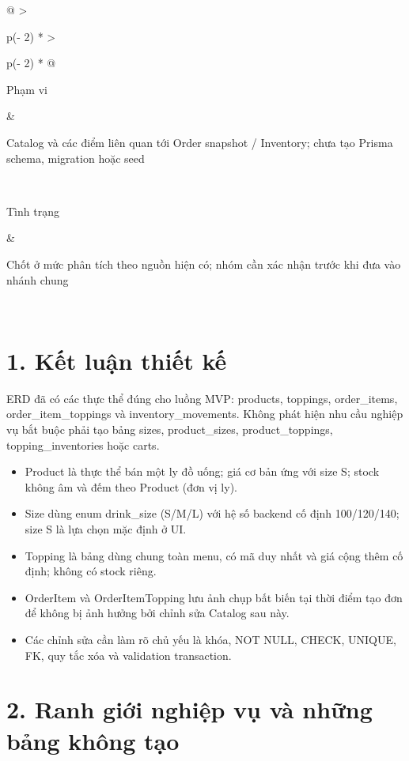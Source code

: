 \documentclass[11pt,a4paper,oneside]{report}
\begin{document}
\begin{longtable}[]{@{}
  >{\raggedright\arraybackslash}p{(\columnwidth - 2\tabcolsep) * }
  >{\raggedright\arraybackslash}p{(\columnwidth - 2\tabcolsep) * }@{}}
\begin{minipage}[b]{\linewidth}
Phạm vi
\end{minipage} & \begin{minipage}[b]{\linewidth}\raggedright
Catalog và các điểm liên quan tới Order snapshot / Inventory; chưa tạo Prisma schema, migration hoặc seed
\end{minipage} \\
\begin{minipage}[b]{\linewidth}\raggedright
Tình trạng
\end{minipage} & \begin{minipage}[b]{\linewidth}\raggedright
Chốt ở mức phân tích theo nguồn hiện có; nhóm cần xác nhận trước khi đưa vào nhánh chung
\end{minipage} \\
\midrule\noalign{}
\endhead
\bottomrule\noalign{}
\endlastfoot
\end{longtable}

\section{1. Kết luận thiết kế}\label{06-product-data-model:kux1ebft-luux1eadn-thiux1ebft-kux1ebf}

ERD đã có các thực thể đúng cho luồng MVP: products, toppings, order\_items, order\_item\_toppings và inventory\_movements. Không phát hiện nhu cầu nghiệp vụ bắt buộc phải tạo bảng sizes, product\_sizes, product\_toppings, topping\_inventories hoặc carts.

\begin{itemize}
\item
  Product là thực thể bán một ly đồ uống; giá cơ bản ứng với size S; stock không âm và đếm theo Product (đơn vị ly).
\item
  Size dùng enum drink\_size (S/M/L) với hệ số backend cố định 100/120/140; size S là lựa chọn mặc định ở UI.
\item
  Topping là bảng dùng chung toàn menu, có mã duy nhất và giá cộng thêm cố định; không có stock riêng.
\item
  OrderItem và OrderItemTopping lưu ảnh chụp bất biến tại thời điểm tạo đơn để không bị ảnh hưởng bởi chỉnh sửa Catalog sau này.
\item
  Các chỉnh sửa cần làm rõ chủ yếu là khóa, NOT NULL, CHECK, UNIQUE, FK, quy tắc xóa và validation transaction.
\end{itemize}

\section{2. Ranh giới nghiệp vụ và những bảng không tạo}\label{06-product-data-model:ranh-giux1edbi-nghiux1ec7p-vux1ee5-vuxe0-nhux1eefng-bux1ea3ng-khuxf4ng-tux1ea1o}
\end{document}
